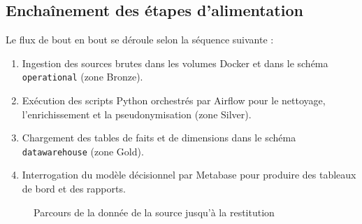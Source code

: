 \documentclass[12pt, a4paper]{report}
\begin{document}
\subsection{Enchaînement des étapes d'alimentation}

Le flux de bout en bout se déroule selon la séquence suivante :

\begin{enumerate}
  \item Ingestion des sources brutes dans les volumes Docker et dans le schéma \texttt{operational} (zone Bronze).
  \item Exécution des scripts Python orchestrés par Airflow pour le nettoyage, l'enrichissement et la pseudonymisation (zone Silver).
  \item Chargement des tables de faits et de dimensions dans le schéma \texttt{datawarehouse} (zone Gold).
  \item Interrogation du modèle décisionnel par Metabase pour produire des tableaux de bord et des rapports.
\end{enumerate}

\begin{figure}[H]
  \centering
  \caption{Parcours de la donnée de la source jusqu’à la restitution}
\end{figure}
\end{document}
